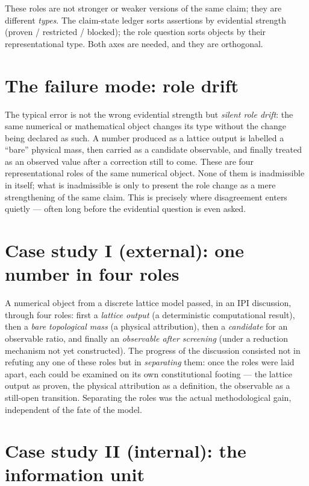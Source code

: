 These roles are not stronger or weaker versions of the same claim; they are different
\emph{types}. The claim-state ledger sorts assertions by evidential strength (proven /
restricted / blocked); the role question sorts objects by their representational type.
Both axes are needed, and they are orthogonal.

\section{The failure mode: role drift}

The typical error is not the wrong evidential strength but \emph{silent role drift}: the
same numerical or mathematical object changes its type without the change being declared
as such. A number produced as a lattice output is labelled a \enquote{bare} physical
mass, then carried as a candidate observable, and finally treated as an observed value
after a correction still to come. These are four representational roles of the same
numerical object. None of them is inadmissible in itself; what is inadmissible is only to
present the role change as a mere strengthening of the same claim. This is precisely
where disagreement enters quietly --- often long before the evidential question is even
asked.

\section{Case study I (external): one number in four roles}

A numerical object from a discrete lattice model passed, in an IPI discussion, through
four roles: first a \emph{lattice output} (a deterministic computational result), then a
\emph{bare topological mass} (a physical attribution), then a \emph{candidate} for an
observable ratio, and finally an \emph{observable after screening} (under a
reduction mechanism not yet constructed). The progress of the discussion consisted not in
refuting any one of these roles but in \emph{separating} them: once the roles were laid
apart, each could be examined on its own constitutional footing --- the lattice output as
proven, the physical attribution as a definition, the observable as a still-open
transition. Separating the roles was the actual methodological gain, independent of the
fate of the model.

\section{Case study II (internal): the information unit}

